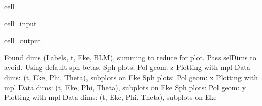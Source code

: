 \documentclass[letterpaper,10pt,english]{jupyterBook}
\begin{document}
\begin{sphinxuseclass}{cell}\begin{sphinxVerbatimInput}

\begin{sphinxuseclass}{cell_input}
\begin{sphinxVerbatim}[commandchars=\\\{\}]
     \PYG{p}{[}  \PYG{p}{]} 

\end{sphinxVerbatim}

\end{sphinxuseclass}\end{sphinxVerbatimInput}
\begin{sphinxVerbatimOutput}

\begin{sphinxuseclass}{cell_output}
\begin{sphinxVerbatim}[commandchars=\\\{\}]
Found dims (\PYGZsq{}Labels\PYGZsq{}, \PYGZsq{}t\PYGZsq{}, \PYGZsq{}Eke\PYGZsq{}, \PYGZsq{}BLM\PYGZsq{}), summing to reduce for plot. Pass selDims to avoid.
Using default sph betas.
Sph plots: Pol geom: z
Plotting with mpl
Data dims: (\PYGZsq{}t\PYGZsq{}, \PYGZsq{}Eke\PYGZsq{}, \PYGZsq{}Phi\PYGZsq{}, \PYGZsq{}Theta\PYGZsq{}), subplots on Eke
Sph plots: Pol geom: x
Plotting with mpl
Data dims: (\PYGZsq{}t\PYGZsq{}, \PYGZsq{}Eke\PYGZsq{}, \PYGZsq{}Phi\PYGZsq{}, \PYGZsq{}Theta\PYGZsq{}), subplots on Eke
Sph plots: Pol geom: y
Plotting with mpl
Data dims: (\PYGZsq{}t\PYGZsq{}, \PYGZsq{}Eke\PYGZsq{}, \PYGZsq{}Phi\PYGZsq{}, \PYGZsq{}Theta\PYGZsq{}), subplots on Eke
\end{sphinxVerbatim}

\noindent{}

\noindent{}

\noindent{}

\noindent{}

\noindent{}

\noindent{}

\end{sphinxuseclass}\end{sphinxVerbatimOutput}

\end{sphinxuseclass}
\end{document}
